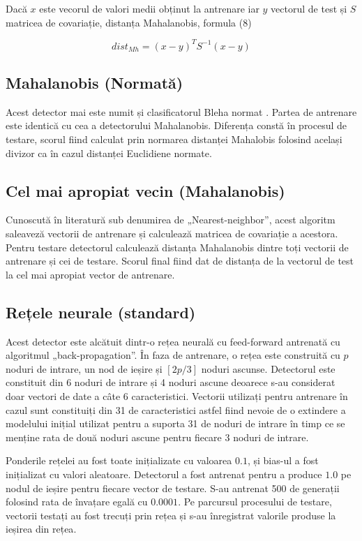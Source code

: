 \documentclass[9pt,shortpaper,twoside,web]{ieeecolor}
\begin{document}
	Dacă $x$ este vecorul de valori medii obținut la antrenare iar $y$ vectorul de test și $S$ matricea de covariație, distanța Mahalanobis, formula (8)

\begin{equation}  \label{eq8}
	dist_{Mh} = (x - y)^T S^{-1}(x - y)
\end{equation}

\subsection{Mahalanobis (Normată)}
	Acest detector mai este numit și clasificatorul Bleha normat \cite{13}. Partea de antrenare este identică cu cea a detectorului Mahalanobis. Diferența constă în procesul de testare, scorul fiind calculat prin normarea distanței Mahalobis folosind același divizor ca în cazul distanței Euclidiene normate.
	
\subsection{Cel mai apropiat vecin (Mahalanobis)}
	Cunoscută în literatură sub denumirea de „Nearest-neighbor”, acest algoritm saleaveză vectorii de antrenare și calculează matricea de covariație a acestora. Pentru testare detectorul calculează distanța Mahalanobis dintre toți vectorii de antrenare și cei de testare. Scorul final fiind dat de distanța de la vectorul de test la cel mai apropiat vector de antrenare.
	
\subsection{Rețele neurale (standard)}
	Acest detector este alcătuit dintr-o rețea neurală cu feed-forward antrenată cu algoritmul „back-propagation”. În faza de antrenare, o rețea este construită cu $p$ noduri de intrare, un nod de ieșire și $[2p/3]$ noduri ascunse. Detectorul este constituit din 6 noduri de intrare și 4 noduri ascune deoarece s-au considerat doar vectori de date a câte 6 caracteristici. Vectorii utilizați pentru antrenare în cazul \cite{13} sunt constituiți din 31 de caracteristici astfel fiind nevoie de o extindere a modelului inițial utilizat pentru a suporta 31 de noduri de intrare în timp ce se menține rata de două noduri ascune pentru fiecare 3 noduri de intrare.
	
	Ponderile rețelei au fost toate inițializate cu valoarea $0.1$, și bias-ul a fost inițializat cu valori aleatoare. Detectorul a fost antrenat pentru a produce $1.0$ pe nodul de ieșire pentru fiecare vector de testare. S-au antrenat 500 de generații folosind rata de învațare egală cu $0.0001$. Pe parcursul procesului de testare, vectorii testați au fost trecuți prin rețea și s-au înregistrat valorile produse la ieșirea din rețea\cite{13}. 
	
\end{document}
